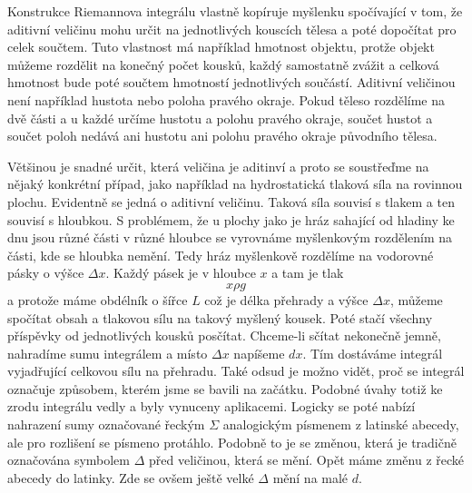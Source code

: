 \documentclass[12pt]{article}
\begin{document}
Konstrukce Riemannova integrálu vlastně kopíruje myšlenku spočívající v tom, že aditivní veličinu mohu určit na jednotlivých kouscích tělesa a poté dopočítat pro celek součtem. Tuto vlastnost má například hmotnost objektu, protže objekt můžeme rozdělit na konečný počet kousků, každý samostatně zvážit a celková hmotnost bude poté součtem hmotností jednotlivých součástí. Aditivní veličinou není například hustota nebo poloha pravého okraje. Pokud těleso rozdělíme na dvě části a u každé určíme hustotu a polohu pravého okraje, součet hustot a součet poloh nedává ani hustotu ani polohu pravého okraje původního tělesa.

Většinou je snadné určit, která veličina je aditinví a proto se soustřeďme na nějaký konkrétní případ, jako například na hydrostatická tlaková síla na rovinnou plochu. Evidentně se jedná o aditivní veličinu. Taková síla souvisí s tlakem a ten souvisí s hloubkou. S problémem, že u plochy jako je hráz sahající od hladiny ke dnu jsou různé části v různé hloubce se vyrovnáme myšlenkovým rozdělením na části, kde se hloubka nemění. Tedy hráz myšlenkově rozdělíme na vodorovné pásky o výšce $ \Delta x$. Každý pásek je v hloubce $x$ a tam je tlak $$x\rho g$$ a protože máme obdélník o šířce $L$ což je délka přehrady a výšce $\Delta x$, můžeme spočítat obsah a tlakovou sílu na takový myšlený kousek. Poté stačí všechny příspěvky od jednotlivých kousků posčítat. Chceme-li sčítat nekonečně jemně, nahradíme sumu integrálem a místo $\Delta x$ napíšeme $dx$. Tím dostáváme integrál vyjadřující celkovou sílu na přehradu. Také odsud je možno vidět, proč se integrál označuje způsobem, kterém jsme se bavili na začátku. Podobné úvahy totiž ke zrodu integrálu vedly a byly vynuceny aplikacemi. Logicky se poté nabízí nahrazení sumy označované řeckým $\Sigma$ analogickým písmenem z latinské abecedy, ale pro rozlišení se písmeno protáhlo. Podobně to je se změnou, která je tradičně označována symbolem $\Delta$ před veličinou, která se mění. Opět máme změnu z řecké abecedy do latinky. Zde se ovšem ještě velké $\Delta$ mění na malé $d$.
\end{document}
